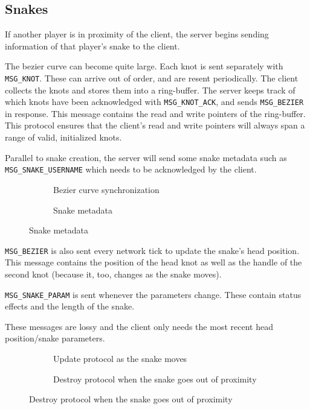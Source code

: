 \subsection{Snakes}

If another player is in  proximity  of  the  client,  the server begins sending
information of that player's snake to the client.

The  bezier  curve  can  become quite large. Each knot is sent separately  with
\verb$MSG_KNOT$. These can arrive out of order,  and  are  resent periodically.
The client  collects  the  knots and stores them into a ring-buffer. The server
keeps track of which knots have been acknowledged with \verb$MSG_KNOT_ACK$, and
sends  \verb$MSG_BEZIER$ in response. This message contains the read and  write
pointers of the ring-buffer. This protocol ensures that the  client's  read and
write  pointers  will  always  span  a  range  of  valid,   initialized  knots.

Parallel  to  snake  creation, the server will send some snake metadata such as
\verb$MSG_SNAKE_USERNAME$ which needs to be acknowledged by the client.

\begin{figure}[H]
    \centering
    \begin{subfigure}{.48\linewidth}
        \centering
        
        \caption{Bezier curve synchronization}
    \end{subfigure}
    \begin{subfigure}{.48\linewidth}
        \centering
        
        \caption{Snake metadata}
    \end{subfigure}
\end{figure}

\verb$MSG_BEZIER$ is also sent every network  tick  to  update the snake's head
position. This  message  contains  the position of the head knot as well as the
handle of the second knot  (because  it,  too,  changes  as  the  snake moves).

\verb$MSG_SNAKE_PARAM$ is sent whenever the parameters  change.  These  contain
status effects and the length of the  snake.

These messages  are  lossy  and  the  client  only  needs  the most recent head
position/snake parameters.

\begin{figure}[H]
    \centering
    \begin{subfigure}[t]{.48\linewidth}
        \centering
        
        \caption{Update protocol as the snake moves}
    \end{subfigure}
    \begin{subfigure}[t]{.48\linewidth}
        \centering
        
        \caption{Destroy protocol when the snake goes out of proximity}
    \end{subfigure}
\end{figure}

